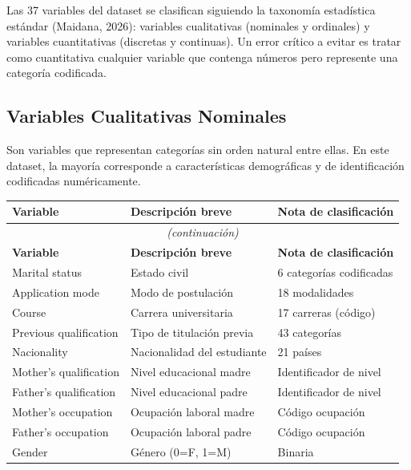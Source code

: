 \documentclass[11pt,a4paper]{article}
\begin{document}
Las 37 variables del dataset se clasifican siguiendo la taxonomía estadística estándar
(Maidana, 2026): variables cualitativas (nominales y ordinales) y variables cuantitativas
(discretas y continuas). Un error crítico a evitar es tratar como cuantitativa cualquier
variable que contenga números pero represente una categoría codificada.

\subsection{Variables Cualitativas Nominales}

Son variables que representan categorías sin orden natural entre ellas. En este dataset,
la mayoría corresponde a características demográficas y de identificación codificadas
numéricamente.

\begin{longtable}{p{6.5cm} p{4.5cm} p{3.5cm}}
  \toprule
  \textbf{Variable} & \textbf{Descripción breve} & \textbf{Nota de clasificación} \\
  \midrule
  \endfirsthead
  \multicolumn{3}{c}{\small\itshape (continuación)}\\
  \toprule
  \textbf{Variable} & \textbf{Descripción breve} & \textbf{Nota de clasificación} \\
  \midrule
  \endhead
  \bottomrule
  \endlastfoot
  Marital status            & Estado civil                  & 6 categorías codificadas \\
  Application mode          & Modo de postulación           & 18 modalidades \\
  Course                    & Carrera universitaria         & 17 carreras (código) \\
  Previous qualification    & Tipo de titulación previa     & 43 categorías \\
  Nacionality               & Nacionalidad del estudiante   & 21 países \\
  Mother's qualification    & Nivel educacional madre       & Identificador de nivel \\
  Father's qualification    & Nivel educacional padre       & Identificador de nivel \\
  Mother's occupation       & Ocupación laboral madre       & Código ocupación \\
  Father's occupation       & Ocupación laboral padre       & Código ocupación \\
  Gender                    & Género (0=F, 1=M)             & Binaria \\

\end{longtable}
\end{document}
